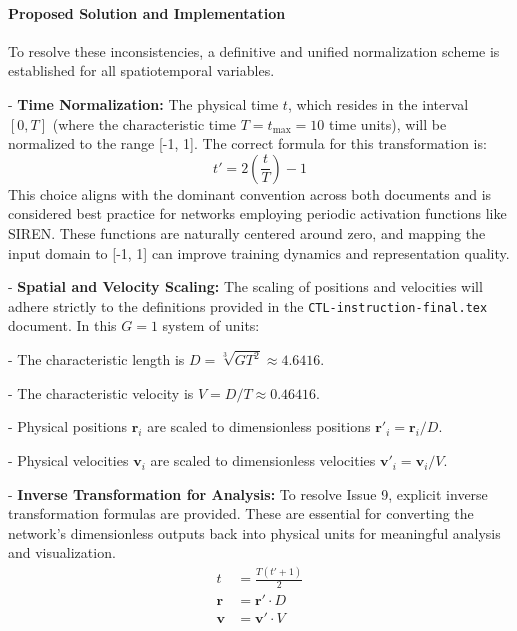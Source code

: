 \documentclass[11pt, a4paper]{article}
\begin{document}
\paragraph{Proposed Solution and Implementation}
To resolve these inconsistencies, a definitive and unified normalization scheme is established for all spatiotemporal variables.

    
- \textbf{Time Normalization:} The physical time $t$, which resides in the interval $[0, T]$ (where the characteristic time $T = t_{\max} = 10$ time units), will be normalized to the range [-1, 1]. The correct formula for this transformation is:
    \begin{equation}
        t' = 2 \left( \frac{t}{T} \right) - 1
    \end{equation}
    This choice aligns with the dominant convention across both documents and is considered best practice for networks employing periodic activation functions like SIREN. These functions are naturally centered around zero, and mapping the input domain to [-1, 1] can improve training dynamics and representation quality.

    
- \textbf{Spatial and Velocity Scaling:} The scaling of positions and velocities will adhere strictly to the definitions provided in the \texttt{CTL-instruction-final.tex} document. In this $G=1$ system of units:
    
        
- The characteristic length is $D = \sqrt[3]{G T^2} \approx 4.6416$.
        
- The characteristic velocity is $V = D / T \approx 0.46416$.
        
- Physical positions $\mathbf{r}_i$ are scaled to dimensionless positions $\mathbf{r}'_i = \mathbf{r}_i / D$.
        
- Physical velocities $\mathbf{v}_i$ are scaled to dimensionless velocities $\mathbf{v}'_i = \mathbf{v}_i / V$.
    

    
- \textbf{Inverse Transformation for Analysis:} To resolve Issue 9, explicit inverse transformation formulas are provided. These are essential for converting the network's dimensionless outputs back into physical units for meaningful analysis and visualization.
    \begin{align}
        t &= \frac{T(t' + 1)}{2} \\
        \mathbf{r} &= \mathbf{r}' \cdot D \\
        \mathbf{v} &= \mathbf{v}' \cdot V
    \end{align}
\end{document}
